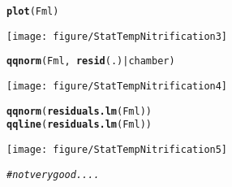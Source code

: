 \documentclass[11pt]{article}\usepackage[]{graphicx}\usepackage[]{color}
\makeatletter
\def\maxwidth{ %
  \ifdim\Gin@nat@width>\linewidth
    \linewidth
  \else
    \Gin@nat@width
  \fi
}
\newcommand{\hlcom}[1]{\textcolor[rgb]{0.678,0.584,0.686}{\textit{#1}}}%
\newcommand{\hlopt}[1]{\textcolor[rgb]{0,0,0}{#1}}%
\newcommand{\hlstd}[1]{\textcolor[rgb]{0.345,0.345,0.345}{#1}}%
\newcommand{\hlkwd}[1]{\textcolor[rgb]{0.737,0.353,0.396}{\textbf{#1}}}%
\newenvironment{kframe}{%
 \def\at@end@of@kframe{}%
 \ifinner\ifhmode%
  \def\at@end@of@kframe{\end{minipage}}%
  \begin{minipage}{\columnwidth}%
 \fi\fi%
 \def\FrameCommand##1{\hskip\@totalleftmargin \hskip-\fboxsep
 \colorbox{shadecolor}{##1}\hskip-\fboxsep
     \hskip-\linewidth \hskip-\@totalleftmargin \hskip\columnwidth}%
 \MakeFramed {\advance\hsize-\width
   \@totalleftmargin\z@ \linewidth\hsize
   \@setminipage}}%
 {\par\unskip\endMakeFramed%
 \at@end@of@kframe}
\newenvironment{knitrout}{}{} %
\makeatother
\begin{document}
\begin{knitrout}
\begin{kframe}
\begin{alltt}
\hlkwd{plot}\hlstd{(Fml)}
\end{alltt}
\end{kframe}
\texttt{[image: figure/StatTempNitrification3]} 
\begin{kframe}\begin{alltt}
\hlkwd{qqnorm}\hlstd{(Fml,} \hlopt{~}\hlkwd{resid}\hlstd{(.)} \hlopt{|} \hlstd{chamber)}
\end{alltt}
\end{kframe}
\texttt{[image: figure/StatTempNitrification4]} 
\begin{kframe}\begin{alltt}
\hlkwd{qqnorm}\hlstd{(}\hlkwd{residuals.lm}\hlstd{(Fml))}
\hlkwd{qqline}\hlstd{(}\hlkwd{residuals.lm}\hlstd{(Fml))}
\end{alltt}
\end{kframe}
\texttt{[image: figure/StatTempNitrification5]} 
\begin{kframe}\begin{alltt}
\hlcom{# not very good....}
\end{alltt}
\end{kframe}
\end{knitrout}
\end{document}
